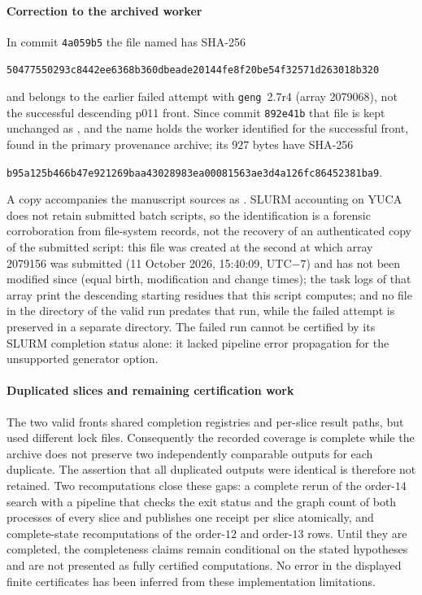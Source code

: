 \paragraph{Correction to the archived worker}
In commit \texttt{4a059b5} the file named \protect{} has SHA-256
\begin{center}\scriptsize\texttt{50477550293c8442ee6368b360dbeade20144fe8f20be54f32571d263018b320}\end{center}
and belongs to the earlier failed attempt with \texttt{geng}~2.7r4 (array 2079068), not the successful descending p011 front. Since commit \texttt{892e41b} that file is kept unchanged as \protect{}, and the name \protect{} holds the worker identified for the successful front, found in the primary provenance archive; its $927$ bytes have SHA-256
\begin{center}\scriptsize\texttt{b95a125b466b47e921269baa43028983ea00081563ae3d4a126fc86452381ba9}.\end{center}
A copy accompanies the manuscript sources as \protect{}. SLURM accounting on YUCA does not retain submitted batch scripts, so the identification is a forensic corroboration from file-system records, not the recovery of an authenticated copy of the submitted script: this file was created at the second at which array 2079156 was submitted (11 October 2026, 15:40:09, UTC$-7$) and has not been modified since (equal birth, modification and change times); the task logs of that array print the descending starting residues that this script computes; and no file in the directory of the valid run predates that run, while the failed attempt is preserved in a separate directory. The failed run cannot be certified by its SLURM completion status alone: it lacked pipeline error propagation for the unsupported generator option.

\paragraph{Duplicated slices and remaining certification work}
The two valid fronts shared completion registries and per-slice result paths, but used different lock files. Consequently the recorded coverage is complete while the archive does not preserve two independently comparable outputs for each duplicate. The assertion that all duplicated outputs were identical is therefore not retained. Two recomputations close these gaps: a complete rerun of the order-$14$ search with a pipeline that checks the exit status and the graph count of both processes of every slice and publishes one receipt per slice atomically, and complete-state recomputations of the order-$12$ and order-$13$ rows. Until they are completed, the completeness claims remain conditional on the stated hypotheses and are not presented as fully certified computations. No error in the displayed finite certificates has been inferred from these implementation limitations.
